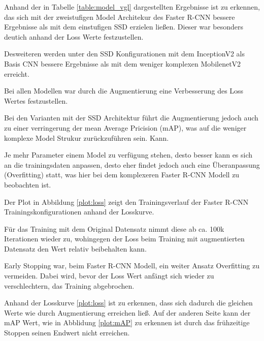 Anhand der in Tabelle \ref{table:model_vgl} dargestellten 
Ergebnisse ist zu erkennen, das sich mit der zweistufigen 
Model Architekur des Faster R-CNN bessere Ergebnisse als mit 
dem einstufigen SSD erzielen ließen. Dieser war besonders 
deutich anhand der Loss Werte festzustellen.

Desweiteren werden unter den SSD Konfigurationen mit dem InceptionV2 
als Basis CNN bessere Ergebnisse als mit dem weniger komplexen 
MobilenetV2 erreicht.

Bei allen Modellen war durch die Augmentierung eine Verbesserung 
des Loss Wertes festzustellen.

Bei den Varianten mit der SSD Architektur führt die Augmentierung
jedoch auch zu einer verringerung der mean Average Pricision (mAP), 
was auf die weniger komplexe Model Strukur zurückzuführen sein. Kann.

Je mehr Parameter einem Model zu verfügung stehen, desto besser kann 
es sich an die trainingsdaten anpassen, desto eher findet jedoch
auch eine Überanpassung (Overfitting) statt, was hier bei dem 
komplexeren Faster R-CNN Modell zu beobachten ist.

Der Plot in Abbildung \ref{plot:loss} zeigt den Trainingsverlauf 
der Faster R-CNN Trainingskonfigurationen anhand der Losskurve.

Für das Training mit dem Original Datensatz nimmt diese ab ca.
100k Iterationen wieder zu, wohingegen der Loss beim Training 
mit augmentierten Datensatz den Wert relativ beibehalten 
kann.

Early Stopping war, beim Faster R-CNN Modell, ein weiter Ansatz 
Overfitting zu vermeiden. Dabei wird, bevor der Loss Wert anfängt
sich wieder zu verschlechtern, das Training abgebrochen.

Anhand der Losskurve \ref{plot:loss} ist zu erkennen, dass sich
dadurch die gleichen Werte wie durch Augmentierung erreichen ließ.
Auf der anderen Seite kann der mAP Wert, wie in Abblidung \ref{plot:mAP}
zu erkennen ist durch das frühzeitige Stoppen seinen Endwert nicht 
erreichen.

\vspace{0.5cm}
\begin{figure}[H]
\begin{minipage}{0.5\textwidth}
  \centering
  \label{plot:mAP}
  \def\svgwidth{0.95\textwidth}
  
\end{minipage}
\begin{minipage}{0.5\textwidth}
  \centering
  \label{plot:Loss}
  \def\svgwidth{0.95\textwidth}
  
\end{minipage}
\end{figure}

